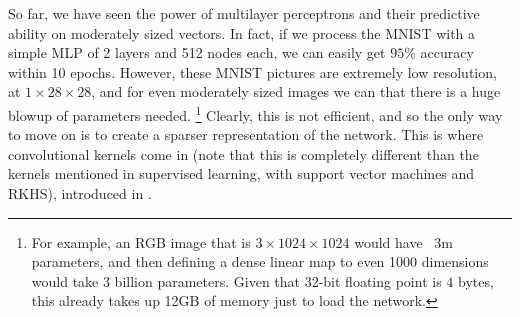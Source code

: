   So far, we have seen the power of multilayer perceptrons and their predictive ability on moderately sized vectors. In fact, if we process the MNIST with a simple MLP of 2 layers and 512 nodes each, we can easily get $95\%$ accuracy within 10 epochs. However, these MNIST pictures are extremely low resolution, at $1 \times 28 \times 28$, and for even moderately sized images we can that there is a huge blowup of parameters needed. \footnote{For example, an RGB image that is $3 \times 1024 \times 1024$ would have ~3m parameters, and then defining a dense linear map to even 1000 dimensions would take 3 billion parameters. Given that 32-bit floating point is $4$ bytes, this already takes up 12GB of memory just to load the network.} Clearly, this is not efficient, and so the only way to move on is to create a sparser representation of the network. This is where convolutional kernels come in (note that this is completely different than the kernels mentioned in supervised learning, with support vector machines and RKHS), introduced in \cite{Lecun1998ConvNets}. 

